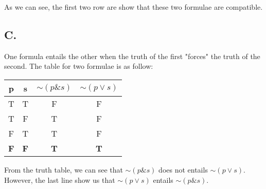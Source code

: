\documentclass{article}
\begin{document}
As we can see, the first two row are show that these two formulae are compatible.

\subsection*{C.}
One formula entails the other when the truth of the first "forces" the truth of the second. The table for two formulae is as follow:

\begin{tabular}{cc|cc}
p & s & $ \sim (p \& s) $ & $ \sim (p \lor s) $ \\ \hline 
T & T & F & F \\
T & F & T & F \\
F & T & T & F \\
\textbf{F} & \textbf{F} & \textbf{T} & \textbf{T} \\
\end{tabular}

From the truth table, we can see that $ \sim (p \& s) $ does not entails $ \sim (p \lor s) $. However, the last line show us that $ \sim (p \lor s) $ entails $ \sim (p \& s) $.
\end{document}
